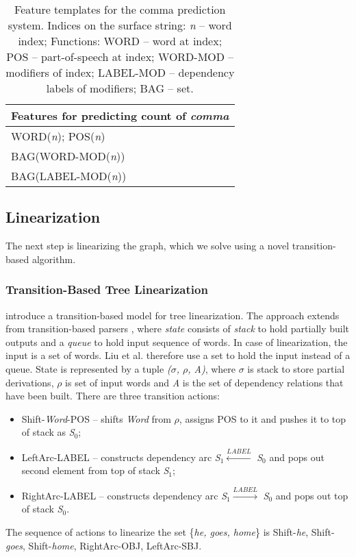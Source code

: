 \documentclass[11pt]{article}
\begin{document}
\begin{table}\centering
\footnotesize
\begin{tabular}{|l|}

  \hline
  Features for predicting count of {\it comma} \\
\hline
	WORD({\it n}); POS({\it n})\\
	BAG(WORD-MOD({\it n}))\\
	BAG(LABEL-MOD({\it n}))\\
  \hline
  
\end{tabular}
\caption{Feature templates for the comma prediction system. Indices on the surface string: {\it n} -- word index; Functions: WORD -- word at index; POS -- part-of-speech at index; WORD-MOD -- modifiers of index; LABEL-MOD -- dependency labels of modifiers; BAG -- set. }
\label{function-word-comma}
\vspace*{-1em}
\end{table}

\subsection{Linearization}
\label{linearization}
The next step is linearizing the graph, which we solve using a novel transition-based algorithm.
\subsubsection{Transition-Based Tree Linearization} 
\label{transition-based-linearization}
 introduce a transition-based model for tree linearization. The approach extends from transition-based parsers \cite{nivre2004deterministic,chen2014fast}, where {\it state} consists of {\it stack} to hold partially built outputs and a {\it queue} to hold input sequence of words. In case of linearization, the input is a set of words. Liu et al. therefore use a set to hold the input instead of a queue. State is represented by a tuple {\it ($\sigma$, $\rho$, A)}, where $\sigma$ is stack to store partial derivations, $\rho$ is set of input words and {\it A} is the set of dependency relations that have been built. There are three transition actions:	
\begin{itemize}[noitemsep,nolistsep]
\item {\sc Shift}-{\it Word}-POS -- shifts {\it Word} from $\rho$, assigns POS to it and pushes it to top of stack as {\it S}$_0$;
\item {\sc LeftArc}-LABEL -- constructs dependency arc {\it S}$_1 \xleftarrow{LABEL}$ {\it S}$_0$ and pops out second element from top of stack {\it S}$_1$;
\item {\sc RightArc}-LABEL -- constructs dependency arc {\it S}$_1 \xrightarrow{LABEL}$ {\it S}$_0$ and pops out top of stack {\it S}$_0$.
\end{itemize} 
The sequence of actions to linearize the set \{{\it he, goes, home}\} is {\sc Shift}-{\it he}, {\sc Shift}-{\it goes}, {\sc Shift}-{\it home}, {\sc RightArc}-OBJ, {\sc LeftArc}-SBJ.
\end{document}
